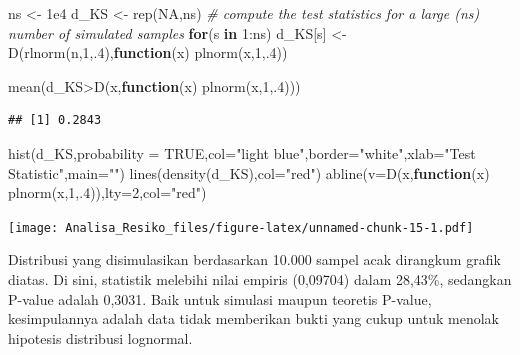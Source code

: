 \documentclass[
]{book}
\newenvironment{Shaded}{\begin{snugshade}}{\end{snugshade}}
\newcommand{\AttributeTok}[1]{\textcolor[rgb]{0.77,0.63,0.00}{#1}}
\newcommand{\CommentTok}[1]{\textcolor[rgb]{0.56,0.35,0.01}{\textit{#1}}}
\newcommand{\ConstantTok}[1]{\textcolor[rgb]{0.00,0.00,0.00}{#1}}
\newcommand{\ControlFlowTok}[1]{\textcolor[rgb]{0.13,0.29,0.53}{\textbf{#1}}}
\newcommand{\DecValTok}[1]{\textcolor[rgb]{0.00,0.00,0.81}{#1}}
\newcommand{\FloatTok}[1]{\textcolor[rgb]{0.00,0.00,0.81}{#1}}
\newcommand{\FunctionTok}[1]{\textcolor[rgb]{0.00,0.00,0.00}{#1}}
\newcommand{\NormalTok}[1]{#1}
\newcommand{\OtherTok}[1]{\textcolor[rgb]{0.56,0.35,0.01}{#1}}
\newcommand{\SpecialCharTok}[1]{\textcolor[rgb]{0.00,0.00,0.00}{#1}}
\newcommand{\StringTok}[1]{\textcolor[rgb]{0.31,0.60,0.02}{#1}}
\begin{document}
\begin{Shaded}
\begin{Highlighting}[]
\NormalTok{ns }\OtherTok{\textless{}{-}} \FloatTok{1e4}
\NormalTok{d\_KS }\OtherTok{\textless{}{-}} \FunctionTok{rep}\NormalTok{(}\ConstantTok{NA}\NormalTok{,ns)}
\CommentTok{\# compute the test statistics for a large (ns) number of simulated samples}
\ControlFlowTok{for}\NormalTok{(s }\ControlFlowTok{in} \DecValTok{1}\SpecialCharTok{:}\NormalTok{ns) d\_KS[s] }\OtherTok{\textless{}{-}} \FunctionTok{D}\NormalTok{(}\FunctionTok{rlnorm}\NormalTok{(n,}\DecValTok{1}\NormalTok{,.}\DecValTok{4}\NormalTok{),}\ControlFlowTok{function}\NormalTok{(x) }\FunctionTok{plnorm}\NormalTok{(x,}\DecValTok{1}\NormalTok{,.}\DecValTok{4}\NormalTok{))}

\FunctionTok{mean}\NormalTok{(d\_KS}\SpecialCharTok{\textgreater{}}\FunctionTok{D}\NormalTok{(x,}\ControlFlowTok{function}\NormalTok{(x) }\FunctionTok{plnorm}\NormalTok{(x,}\DecValTok{1}\NormalTok{,.}\DecValTok{4}\NormalTok{)))}
\end{Highlighting}
\end{Shaded}

\begin{verbatim}
## [1] 0.2843
\end{verbatim}

\begin{Shaded}
\begin{Highlighting}[]
\FunctionTok{hist}\NormalTok{(d\_KS,}\AttributeTok{probability =} \ConstantTok{TRUE}\NormalTok{,}\AttributeTok{col=}\StringTok{"light blue"}\NormalTok{,}\AttributeTok{border=}\StringTok{"white"}\NormalTok{,}\AttributeTok{xlab=}\StringTok{"Test Statistic"}\NormalTok{,}\AttributeTok{main=}\StringTok{""}\NormalTok{)}
\FunctionTok{lines}\NormalTok{(}\FunctionTok{density}\NormalTok{(d\_KS),}\AttributeTok{col=}\StringTok{"red"}\NormalTok{)}
\FunctionTok{abline}\NormalTok{(}\AttributeTok{v=}\FunctionTok{D}\NormalTok{(x,}\ControlFlowTok{function}\NormalTok{(x) }\FunctionTok{plnorm}\NormalTok{(x,}\DecValTok{1}\NormalTok{,.}\DecValTok{4}\NormalTok{)),}\AttributeTok{lty=}\DecValTok{2}\NormalTok{,}\AttributeTok{col=}\StringTok{"red"}\NormalTok{)}
\end{Highlighting}
\end{Shaded}

\texttt{[image: Analisa\_Resiko\_files/figure-latex/unnamed-chunk-15-1.pdf]}

Distribusi yang disimulasikan berdasarkan 10.000 sampel acak dirangkum grafik diatas. Di sini, statistik melebihi nilai empiris (0,09704) dalam 28,43\%, sedangkan P-value adalah 0,3031. Baik untuk simulasi maupun teoretis P-value, kesimpulannya adalah data tidak memberikan bukti yang cukup untuk menolak hipotesis distribusi lognormal.
\end{document}
